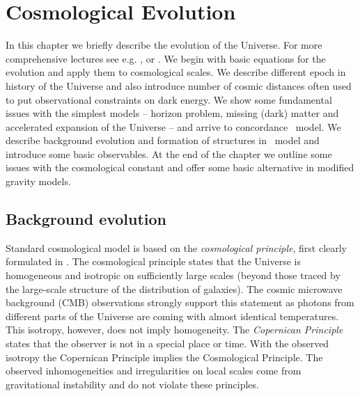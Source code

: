 \chapter{Cosmological Evolution}

In this chapter we briefly describe the evolution of the Universe. For more comprehensive lectures see e.g. \textcite{Ref:Weinberg}, \textcite{2002col.luc..cosmology} or \textcite{2010deto.book.....A}. We begin with basic equations for the evolution and apply them to cosmological scales. We describe different epoch in history of the Universe and also introduce number of cosmic distances often used to put observational constraints on dark energy. We show some fundamental issues with the simplest models -- horizon problem, missing (dark) matter and accelerated expansion of the Universe -- and arrive to concordance \LCDM\ model. We describe background evolution and formation of structures in \LCDM\ model and introduce some basic observables. At the end of the chapter we outline some issues with the cosmological constant and offer some basic alternative in modified gravity models.

\section{Background evolution}
Standard cosmological model is based on the \textit{cosmological principle}, first clearly formulated in \textcite{1687pnpm.book.....N}. The cosmological principle states that the Universe is homogeneous and isotropic on sufficiently large scales (beyond those traced by the large-scale structure of the distribution of galaxies). The cosmic microwave background (CMB) observations strongly support this statement as photons from different parts of the Universe are coming with almost identical temperatures. This isotropy, however, does not imply homogeneity. The \textit{Copernican Principle} states that the observer is not in a special place or time. With the observed isotropy the Copernican Principle implies the Cosmological Principle. The observed inhomogeneities and irregularities on local scales come from gravitational instability and do not violate these principles.

